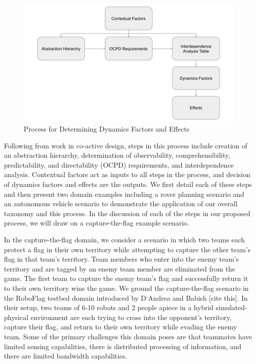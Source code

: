 \documentclass[letterpaper, 10 pt, conference]{ieeeconf}  %
\theoremstyle{definition}
\begin{document}
    \begin{figure}[tb]
    \centering
    \includegraphics[width=\columnwidth]{TaxonomyDesign.png}
   \caption{Process for Determining Dynamics Factors and Effects}
    \label{fig:tax_design}
    \end{figure}

Following from work in co-active design, steps in this process include creation of an abstraction hierarchy, determination of observability, comprehensibility, predictability, and directability (OCPD) requirements, and interdependence analysis. Contextual factors act as inputs to all steps in the process, and decision of dynamics factors and effects are the outputs. We first detail each of these steps and then present two domain examples including a rover planning scenario and an autonomous vehicle scenario to demonstrate the application of our overall taxonomy and this process. In the discussion of each of the steps in our proposed process, we will draw on a capture-the-flag example scenario.

In the capture-the-flag domain, we consider a scenario in which two teams each protect a flag in their own territory while attempting to capture the other team's flag in that team's territory. Team members who enter into the enemy team's territory and are tagged by an enemy team member are eliminated from the game. The first team to capture the enemy team's flag and successfully return it to their own territory wins the game. We ground the capture-the-flag scenario in the RoboFlag testbed domain introduced by D`Andrea and Babish [cite this]. In their setup, two teams of 6-10 robots and 2 people apiece in a hybrid simulated-physical environment are each trying to cross into the opponent’s territory, capture their flag, and return to their own territory while evading the enemy team. Some of the primary challenges this domain poses are that teammates have limited sensing capabilities, there is distributed processing of information, and there are limited bandwidth capabilities.
\end{document}
